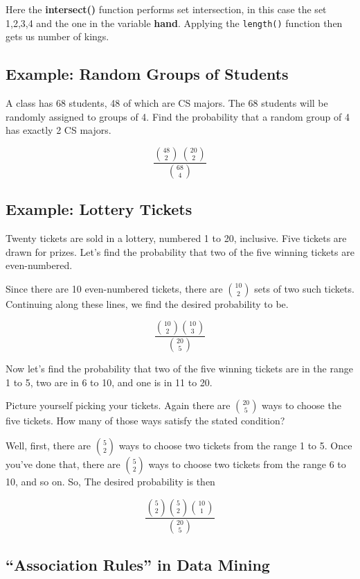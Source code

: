 Here the {\bf intersect()} function performs set intersection, in this
case the set {1,2,3,4} and the one in the variable {\bf hand}.  Applying
the {\tt length()} function then gets us number of kings.

\subsection{Example:  Random Groups of Students}

A class has 68 students, 48 of which are CS majors.  The
68 students will be randomly assigned to groups of 4.  Find the
probability that a random group of 4 has exactly 2 CS majors.

$$
\frac
{\binom{48}{2} ~ \binom{20}{2}}
{\binom{68}{4}}
$$


\subsection{Example:  Lottery Tickets}
\label{lottery}

Twenty tickets are sold in a lottery, numbered 1 to 20,
inclusive.  Five tickets are drawn for prizes.  Let's find the
probability that two of the five winning tickets are
even-numbered.

Since there are 10 even-numbered tickets, there are $\binom{10}{2}$ sets
of two such tickets.  Continuing along these lines, we find the desired
probability to be.

\begin{equation}
\frac
{\binom{10}{2} \binom{10}{3}}
{\binom{20}{5}}
\end{equation}

Now let's find the probability that two of the five winning tickets are
in the range 1 to 5, two are in 6 to 10, and one is in 11 to 20.  

Picture yourself picking your tickets.  Again there are $\binom{20}{5}$
ways to choose the five tickets.  How many of those ways satisfy the
stated condition?

Well, first, there are $\binom{5}{2}$ ways to choose two tickets from
the range 1 to 5.  Once you've done that, there are $\binom{5}{2}$ ways
to choose two tickets from the range 6 to 10, and so on.  So, The
desired probability is then

\begin{equation}
\frac
{\binom{5}{2} \binom{5}{2} \binom{10}{1}} 
{\binom{20}{5}}
\end{equation}

\subsection{``Association Rules'' in Data Mining}
\label{assocrules}

